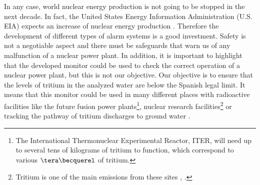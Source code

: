In any case, world nuclear energy production is not going to be stopped in the next decade. In fact, the United States Energy Information Administration (U.S. EIA) expects an increase of nuclear energy production \cite{EIAOutlook}. Therefore the development of  different types of alarm systems is a good investment. Safety is not a negotiable aspect and there must be safeguards that warn us of any malfunction of a nuclear power plant. In addition, it is important to highlight that the developed monitor could be used to check the correct operation of a nuclear power plant, but this is not our objective. Our objective is to ensure that the levels of tritium in the analyzed water are below the Spanish legal limit. It means that this monitor could be used in many different places with radioactive facilities like the future fusion power plants\footnote{The International Thermonuclear Experimental Reactor, ITER, will need up to several tens of kilograms of tritium to function, which correspond to various $\tera\becquerel$ of tritium.}, nuclear research facilities\footnote{Tritium is one of the main emissions from these sites \cite{FERMILAB}, \cite{BrookHavenNationalLaboratory}.} or tracking the pathway of tritium discharges to ground water \cite{TrackingTritium}. 

